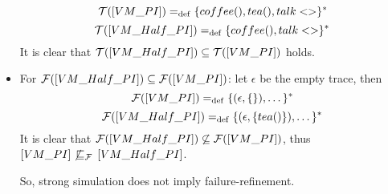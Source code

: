 \begin{prf}
\begin{itemize}
    \[\traces[VM\_PI] \define \{coffee(),tea(),talk<>\}^\ast\]
    \[\traces[VM\_Half\_PI] \define \{coffee(),talk<>\}^\ast\]
It is clear that $\traces[VM\_Half\_PI]\subseteq\traces[VM\_PI]$ holds. 

\item For $\failures[VM\_Half\_PI]\subseteq\failures[VM\_PI]$: let $\epsilon$ be the empty trace, then
    \[\failures[VM\_PI] \define \{(\epsilon,\{\}),\dots\}^\ast\]
    \[\failures[VM\_Half\_PI] \define \{(\epsilon,\{tea()\}),\dots\}^\ast\]
It is clear that $\failures[VM\_Half\_PI]\not\subseteq\failures[VM\_PI]$, thus $\ec{VM\_PI} \not\refiF \ec{VM\_Half\_PI}$.

So, strong simulation does not imply failure-refinement. 
\end{itemize}
\end{prf}
